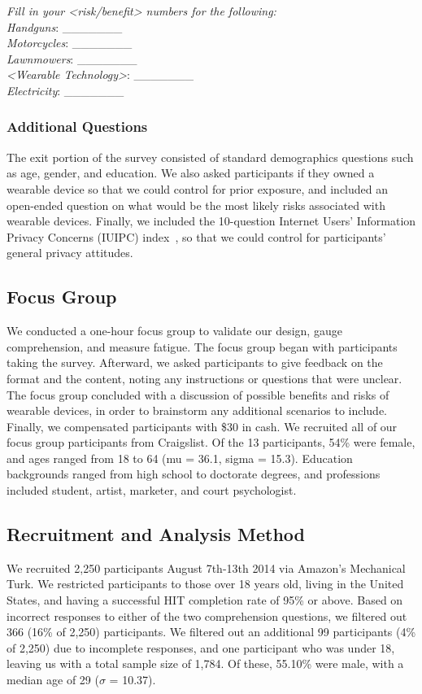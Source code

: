 \documentclass{acm_proc_article-sp}
\begin{document}
\textit{Fill in your <risk/benefit> numbers for the following:}\\[-.5cm]

\textit{Handguns}: \_\_\_\_\_\_\_ \\
\textit{Motorcycles}: \_\_\_\_\_\_\_\\
\textit{Lawnmowers}: \_\_\_\_\_\_\_\\
\textit{<Wearable Technology>}: \_\_\_\_\_\_\_\\
\textit{Electricity}: \_\_\_\_\_\_\_\\ [-.5cm]

\subsubsection{Additional Questions}
The exit portion of the survey consisted of standard demographics questions such as age, gender, and education. We also asked participants if they owned a wearable device so that we could control for prior exposure, and included an open-ended question on what would be the most likely risks associated with wearable devices. Finally, we included the 10-question Internet Users' Information Privacy Concerns (IUIPC) index~\cite{malhotra2004internet}, so that we could control for participants' general privacy attitudes.

\subsection{Focus Group}
We conducted a one-hour focus group to validate our design, gauge comprehension, and measure fatigue. The focus group began with participants taking the survey. Afterward, we asked participants to give feedback on the format and the content, noting any instructions or questions that were unclear. The focus group concluded with a discussion of possible benefits and risks of wearable devices, in order to brainstorm any additional scenarios to include. Finally, we compensated participants with \$30 in cash. We recruited all of our focus group participants from Craigslist. Of the 13 participants, 54\% were female, and ages ranged from 18 to 64 (mu = 36.1, sigma = 15.3).  Education backgrounds ranged from high school to doctorate degrees, and professions included student, artist, marketer, and court psychologist.

\subsection{Recruitment and Analysis Method}
We recruited 2,250 participants August 7th-13th 2014 via Amazon's Mechanical Turk. We restricted participants to those over 18 years old, living in the United States, and having a successful HIT completion rate of 95\% or above. Based on incorrect responses to either of the two comprehension questions, we filtered out 366 (16\% of 2,250) participants. We filtered out an additional 99 participants (4\% of 2,250) due to incomplete responses, and one participant who was under 18, leaving us with a total sample size of 1,784. Of these, 55.10\% were male, with a median age of 29 ($\sigma$ = 10.37).
\end{document}
